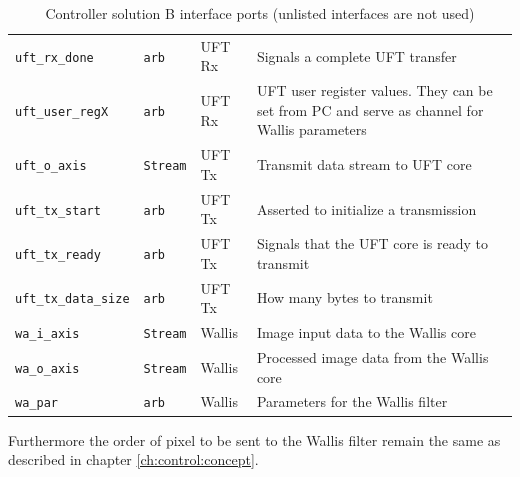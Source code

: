\begin{table}[t!]
\begin{tabular}{l l l p{8cm}}
        \texttt{uft\_rx\_done} & \texttt{arb} & UFT Rx &
        Signals a complete UFT transfer
        \\  
        \texttt{uft\_user\_regX} & \texttt{arb} & UFT Rx &
        UFT user register values. They can be set from PC and serve as channel
        for Wallis parameters
        \\  
        \midrule
        \texttt{uft\_o\_axis} & \texttt{Stream} & UFT Tx &
        Transmit data stream to UFT core
        \\
        \texttt{uft\_tx\_start} & \texttt{arb} & UFT Tx &
        Asserted to initialize a transmission
        \\
        \texttt{uft\_tx\_ready} & \texttt{arb} & UFT Tx &
        Signals that the UFT core is ready to transmit
        \\
        \texttt{uft\_tx\_data\_size} & \texttt{arb} & UFT Tx &
        How many bytes to transmit
        \\
        \midrule
        \texttt{wa\_i\_axis} & \texttt{Stream} & Wallis &
        Image input data to the Wallis core
        \\
        \texttt{wa\_o\_axis} & \texttt{Stream} & Wallis &
        Processed image data from the Wallis core
        \\
        \texttt{wa\_par} & \texttt{arb} & Wallis &
        Parameters for the Wallis filter
        \\
        \bottomrule
    \end{tabular}
    \caption{Controller solution B interface ports (unlisted interfaces
    are not used)}
    \label{tab:controllerbports}
\end{table}

Furthermore the order of pixel to be sent to the Wallis filter remain the same
as described in chapter \ref{ch:control:concept}. 

